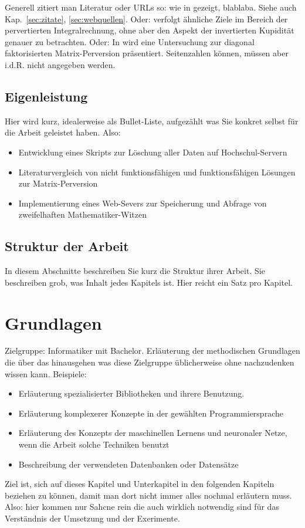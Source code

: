 \documentclass[12pt,oneside]{article}
\begin{document}
Generell zitiert man Literatur oder URLs so: wie in \cite{kimball2011data} gezeigt, blablaba. Siehe auch Kap.~\ref{sec:zitate}, \ref{sec:webquellen}. Oder: \cite{katsifodimos2016apache} verfolgt ähnliche Ziele im Bereich der pervertierten Integralrechnung, ohne aber den Aspekt der invertierten Kupidität genauer zu betrachten. Oder: In \cite{clemen1989combining} wird eine Untersuchung zur diagonal faktorisierten Matrix-Perversion präsentiert. Seitenzahlen können, müssen aber i.d.R. nicht angegeben werden.

\subsection{Eigenleistung}
Hier wird kurz, idealerweise als Bullet-Liste, aufgezählt was Sie konkret selbst für die Arbeit geleistet haben. Also:
\begin{itemize}
    \item Entwicklung eines Skripts zur Löschung aller Daten auf Hochschul-Servern
    \item Literaturvergleich von nicht funktionsfähigen und funktionsfähigen Lösungen zur Matrix-Perversion
    \item Implementierung eines Web-Severs zur Speicherung und Abfrage von zweifelhaften Mathematiker-Witzen
\end{itemize}


\subsection{Struktur der Arbeit}
In diesem Abschnitte beschreiben Sie kurz die Struktur ihrer Arbeit.
Sie beschreiben grob, was Inhalt jedes Kapitels ist. Hier reicht ein Satz pro Kapitel.

\section{Grundlagen}\label{sec:grundlagen}
Zielgruppe: Informatiker mit Bachelor. Erläuterung der methodischen Grundlagen die
über das hinausgehen was diese Zielgruppe üblicherweise ohne nachzudenken wissen kann.
Beispiele:
\begin{itemize}
\item Erläuterung spezialisierter Bibliotheken und ihrere Benutzung.
\item Erläuterung komplexerer Konzepte in der gewählten Programmiersprache
\item Erläuterung des Konzepts der maschinellen Lernens und neuronaler Netze, wenn die Arbeit solche Techniken benutzt
\item Beschreibung der verwendeten Datenbanken oder Datensätze
\end{itemize}
%
Ziel ist, sich auf dieses Kapitel und Unterkapitel in den folgenden Kapiteln beziehen zu können, damit man dort nicht immer alles nochmal erläutern muss. Also: hier kommen nur Sahcne rein die auch wirklich notwendig sind für das Verständnis der Umsetzung und der Exerimente.
\end{document}
